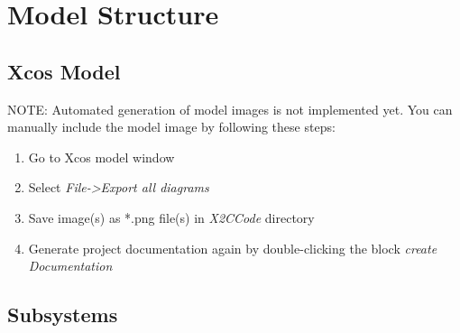 \section{Model Structure}
\label{sec:model_structure}

\subsection{Xcos Model}
NOTE: Automated generation of model images is not implemented yet.
You can manually include the model image by following these steps:
\begin{enumerate}
  \item{Go to Xcos model window}
  \item{Select \textit{File->Export all diagrams}}
  \item{Save image(s) as *.png file(s) in \textit{X2CCode} directory}
  \item{Generate project documentation again by double-clicking the block \textit{create Documentation}}
\end{enumerate}
\subsection{Subsystems}
